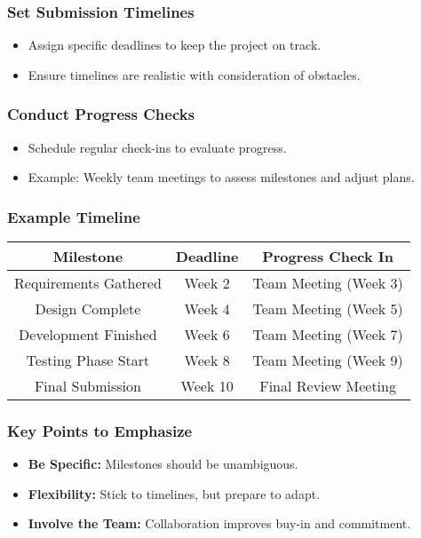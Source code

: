 \documentclass[aspectratio=169]{beamer}
\begin{document}
\begin{frame}[fragile]
    \frametitle{Set Submission Timelines}
    \begin{itemize}
        \item Assign specific deadlines to keep the project on track.
        \item Ensure timelines are realistic with consideration of obstacles.
    \end{itemize}
\end{frame}

\begin{frame}[fragile]
    \frametitle{Conduct Progress Checks}
    \begin{itemize}
        \item Schedule regular check-ins to evaluate progress.
        \item Example: Weekly team meetings to assess milestones and adjust plans.
    \end{itemize}
\end{frame}

\begin{frame}[fragile]
    \frametitle{Example Timeline}
    \begin{table}[ht]
        \centering
        \begin{tabular}{|c|c|c|}
            \hline
            \textbf{Milestone} & \textbf{Deadline} & \textbf{Progress Check In} \\
            \hline
            Requirements Gathered & Week 2 & Team Meeting (Week 3) \\
            \hline
            Design Complete & Week 4 & Team Meeting (Week 5) \\
            \hline
            Development Finished & Week 6 & Team Meeting (Week 7) \\
            \hline
            Testing Phase Start & Week 8 & Team Meeting (Week 9) \\
            \hline
            Final Submission & Week 10 & Final Review Meeting \\
            \hline
        \end{tabular}
    \end{table}
\end{frame}

\begin{frame}[fragile]
    \frametitle{Key Points to Emphasize}
    \begin{itemize}
        \item \textbf{Be Specific:} Milestones should be unambiguous.
        \item \textbf{Flexibility:} Stick to timelines, but prepare to adapt.
        \item \textbf{Involve the Team:} Collaboration improves buy-in and commitment.
    \end{itemize}
\end{frame}
\end{document}
